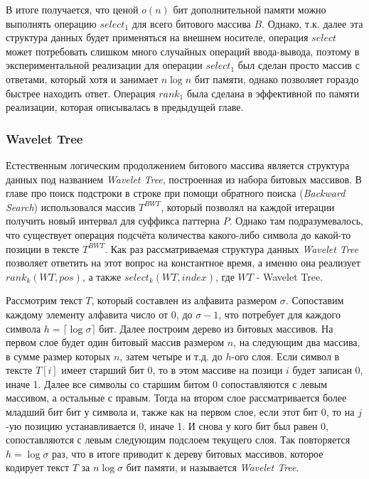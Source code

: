 \documentclass[a4paper,12pt]{article}
\begin{document}
В итоге получается, что ценой $o(n)$ бит дополнительной памяти можно выполнять операцию $select_1$ для всего битового массива $B$. Однако, т.к. далее эта структура данных будет применяться на внешнем носителе, операция $select$ может потребовать слишком много случайных операций ввода-вывода, поэтому в экспериментальной реализации для операции $select_1$ был сделан просто массив с ответами, который хотя и занимает $n\log{n}$ бит памяти, однако позволяет гораздо быстрее находить ответ. Операция $rank_1$ была сделана в эффективной по памяти реализации, которая описывалась в предыдущей главе.

\subsubsection{Wavelet Tree}
Естественным логическим продолжением битового массива является структура данных под названием \textit{Wavelet Tree}, построенная из набора битовых массивов. В главе про поиск подстроки в строке при помощи обратного поиска (\textit{Backward Search}) использовался массив $T^{BWT}$, который позволял на каждой итерации получить новый интервал для суффикса паттерна $P$. Однако там подразумевалось, что существует операция подсчёта количества какого-либо символа до какой-то позиции в тексте $T^{BWT}$. Как раз рассматриваемая структура данных \textit{Wavelet Tree} позволяет ответить на этот вопрос на константное время, а именно она реализует $rank_k(WT, pos)$, а также $select_k(WT, index)$, где $WT$ - Wavelet Tree.

Рассмотрим текст $T$, который составлен из алфавита размером $\sigma$. Сопоставим каждому элементу алфавита число от $0$, до $\sigma - 1$, что потребует для каждого символа $h = \lceil \log \sigma \rceil$ бит. Далее построим дерево из битовых массивов. На первом слое будет один битовый массив размером $n$, на следующим два массива, в сумме размер которых $n$, затем четыре и т.д. до $h$-ого слоя. Если символ в тексте $T[i]$ имеет старший бит 0, то в этом массиве на позици $i$ будет записан 0, иначе 1. Далее все символы со старшим битом 0 сопоставляются с левым массивом, а остальные с правым. Тогда на втором слое рассматривается более младший бит бит у символа и, также как на первом слое, если этот бит 0, то на $j$-ую позицию устанавливается 0, иначе 1. И снова у кого бит был равен 0, сопоставляются с левым следующим подслоем текущего слоя. Так повторяется $h = \log \sigma$ раз, что в итоге приводит к дереву битовых массивов, которое кодирует текст $T$ за $n \log \sigma$ бит памяти, и называется \textit{Wavelet Tree}.
\end{document}
